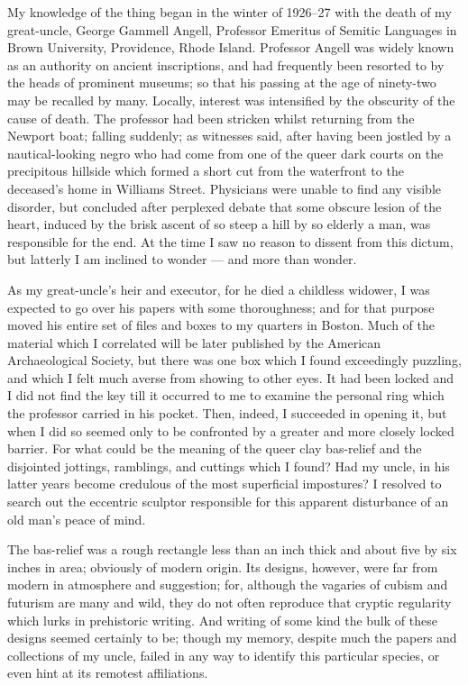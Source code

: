 My knowledge of the thing began in the winter of 1926--27 with the death
of my great-uncle, George Gammell Angell, Professor Emeritus of Semitic
Languages in Brown University, Providence, Rhode Island. Professor
Angell was widely known as an authority on ancient inscriptions, and had
frequently been resorted to by the heads of prominent museums; so that
his passing at the age of ninety-two may be recalled by many. Locally,
interest was intensified by the obscurity of the cause of death. The
professor had been stricken whilst returning from the Newport boat;
falling suddenly; as witnesses said, after having been jostled by a
nautical-looking negro who had come from one of the queer dark courts on
the precipitous hillside which formed a short cut from the waterfront to
the deceased's home in Williams Street. Physicians were unable to find
any visible disorder, but concluded after perplexed debate that some
obscure lesion of the heart, induced by the brisk ascent of so steep a
hill by so elderly a man, was responsible for the end. At the time I saw
no reason to dissent from this dictum, but latterly I am inclined to
wonder --- and more than wonder.

As my great-uncle's heir and executor, for he died a childless widower,
I was expected to go over his papers with some thoroughness; and for
that purpose moved his entire set of files and boxes to my quarters in
Boston. Much of the material which I correlated will be later published
by the American Archaeological Society, but there was one box which I
found exceedingly puzzling, and which I felt much averse from showing to
other eyes. It had been locked and I did not find the key till it
occurred to me to examine the personal ring which the professor carried
in his pocket. Then, indeed, I succeeded in opening it, but when I did
so seemed only to be confronted by a greater and more closely locked
barrier. For what could be the meaning of the queer clay bas-relief and
the disjointed jottings, ramblings, and cuttings which I found? Had my
uncle, in his latter years become credulous of the most superficial
impostures? I resolved to search out the eccentric sculptor responsible
for this apparent disturbance of an old man's peace of mind.

The bas-relief was a rough rectangle less than an inch thick and about
five by six inches in area; obviously of modern origin. Its designs,
however, were far from modern in atmosphere and suggestion; for,
although the vagaries of cubism and futurism are many and wild, they do
not often reproduce that cryptic regularity which lurks
in prehistoric
writing. And writing of some kind the bulk of these designs seemed
certainly to be; though my memory, despite much the papers and
collections of my uncle, failed in any way to identify this particular
species, or even hint at its remotest affiliations.

